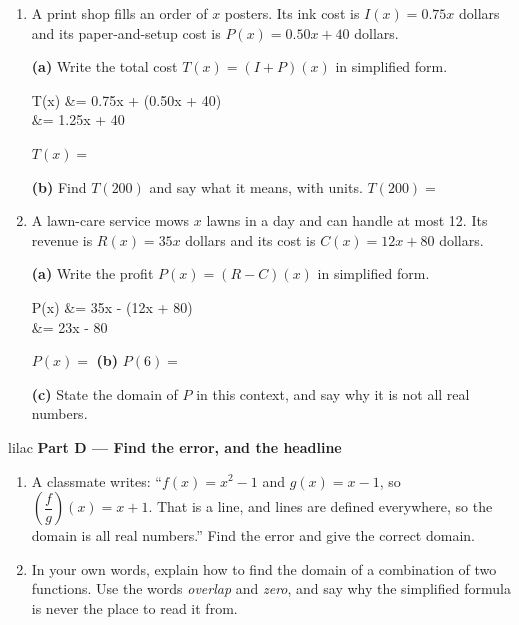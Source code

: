 \documentclass[10pt]{article}
\begin{document}
\begin{enumerate}[leftmargin=1.9em, itemsep=8pt, start=6]

\item A print shop fills an order of $x$ posters. Its ink cost is $I(x) = 0.75x$ dollars and its
      paper-and-setup cost is $P(x) = 0.50x + 40$ dollars.

      \textbf{(a)} Write the total cost $T(x) = (I + P)(x)$ in simplified form.

\begin{work}
  T(x) &= 0.75x + (0.50x + 40) \\
       &= 1.25x + 40
\end{work}

      $T(x) = $ \blank{3.0cm}

      \textbf{(b)} Find $T(200)$ and say what it means, with units. \quad $T(200) = $ \blank{2.2cm}

\item A lawn-care service mows $x$ lawns in a day and can handle at most 12. Its revenue is
      $R(x) = 35x$ dollars and its cost is $C(x) = 12x + 80$ dollars.

      \textbf{(a)} Write the profit $P(x) = (R - C)(x)$ in simplified form.

\begin{work}
  P(x) &= 35x - (12x + 80) \\
       &= 23x - 80
\end{work}

      $P(x) = $ \blank{3.0cm} \qquad \textbf{(b)} $P(6) = $ \blank{2.2cm}

      \textbf{(c)} State the domain of $P$ in this context, and say why it is not all real numbers.
      \writespace{1.1cm}{}

\end{enumerate}

\vspace{0.1in}

\begin{headlinebox}{lilac}
\textbf{\color{plum}Part D --- Find the error, and the headline}
\end{headlinebox}

\begin{enumerate}[leftmargin=1.9em, itemsep=8pt, start=8]

\item A classmate writes: ``$f(x) = x^2 - 1$ and $g(x) = x - 1$, so
      $\left(\dfrac{f}{g}\right)(x) = x + 1$. That is a line, and lines are defined everywhere,
      so the domain is all real numbers.'' Find the error and give the correct domain.
      \writespace{1.5cm}{}

\item In your own words, explain how to find the domain of a combination of two functions. Use
      the words \emph{overlap} and \emph{zero}, and say why the simplified formula is never the
      place to read it from.
      \writespace{1.5cm}{}

\end{enumerate}
\end{document}
